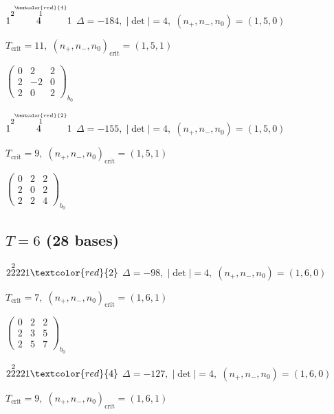 \documentclass[10pt]{article}
\begin{document}
\smallskip

$1\overset{2\overset{\textcolor{red}{4}}{1}}{4}1$ \quad $\Delta=-184,\; |\det|=4,\; (n_+,n_-,n_0)=(1,5,0)$

\hspace{1em}$T_{\text{crit}}=11,\; (n_+,n_-,n_0)_{\text{crit}}=(1,5,1)$

\hspace{2em}$\left(\begin{smallmatrix}0 & 2 & 2 \\ 2 & -2 & 0 \\ 2 & 0 & 2\end{smallmatrix}\right)_{\!b_0}$

$1\overset{2\overset{\textcolor{red}{2}}{1}}{4}1$ \quad $\Delta=-155,\; |\det|=4,\; (n_+,n_-,n_0)=(1,5,0)$

\hspace{1em}$T_{\text{crit}}=9,\; (n_+,n_-,n_0)_{\text{crit}}=(1,5,1)$

\hspace{2em}$\left(\begin{smallmatrix}0 & 2 & 2 \\ 2 & 0 & 2 \\ 2 & 2 & 4\end{smallmatrix}\right)_{\!b_0}$


\subsection*{$T = 6$ \quad (28 bases)}
\smallskip

$2\overset{2}{2}221\textcolor{red}{2}$ \quad $\Delta=-98,\; |\det|=4,\; (n_+,n_-,n_0)=(1,6,0)$

\hspace{1em}$T_{\text{crit}}=7,\; (n_+,n_-,n_0)_{\text{crit}}=(1,6,1)$

\hspace{2em}$\left(\begin{smallmatrix}0 & 2 & 2 \\ 2 & 3 & 5 \\ 2 & 5 & 7\end{smallmatrix}\right)_{\!b_0}$

$2\overset{2}{2}221\textcolor{red}{4}$ \quad $\Delta=-127,\; |\det|=4,\; (n_+,n_-,n_0)=(1,6,0)$

\hspace{1em}$T_{\text{crit}}=9,\; (n_+,n_-,n_0)_{\text{crit}}=(1,6,1)$
\end{document}

